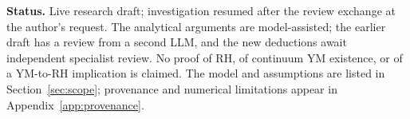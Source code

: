 \documentclass[11pt]{article}
\begin{document}
\noindent\textbf{Status.} Live research draft; investigation resumed after
the review exchange at the author's request. The analytical arguments
are model-assisted; the earlier draft has a review from a second LLM,
and the new deductions await independent specialist review. No proof of RH,
of continuum YM existence, or of a YM-to-RH implication is claimed.
The model and assumptions are listed in Section~\ref{sec:scope};
provenance and numerical limitations appear in Appendix~\ref{app:provenance}.
\clearpage
{\small\tableofcontents}
\clearpage













\appendix



\clearpage
\end{document}
